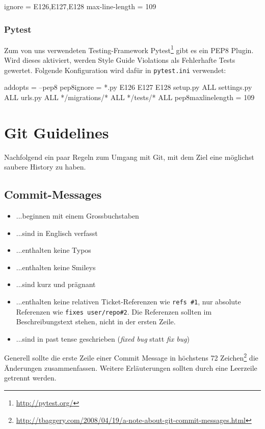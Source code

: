 \begin{inicode}
[flake8]
ignore = E126,E127,E128
max-line-length = 109
\end{inicode}

\subsubsection{Pytest}

Zum von uns verwendeten Testing-Framework
Pytest\footnote{\url{http://pytest.org/}} gibt es ein PEP8 Plugin. Wird dieses
aktiviert, werden Style Guide Violations als Fehlerhafte Tests gewertet.
Folgende Konfiguration wird dafür in \texttt{pytest.ini} verwendet:

\begin{inicode}
[pytest]
addopts = --pep8
pep8ignore =
    *.py E126 E127 E128
    setup.py ALL
    settings.py ALL
    urls.py ALL
    */migrations/* ALL
    */tests/* ALL
pep8maxlinelength = 109
\end{inicode}


\section{Git Guidelines}

Nachfolgend ein paar Regeln zum Umgang mit Git, mit dem Ziel eine möglichst
saubere History zu haben.

\subsection{Commit-Messages}

\begin{itemize}
	\item ...beginnen mit einem Grossbuchstaben
	\item ...sind in Englisch verfasst
	\item ...enthalten keine Typos
	\item ...enthalten keine Smileys
	\item ...sind kurz und prägnant
	\item ...enthalten keine relativen Ticket-Referenzen wie \texttt{refs \#1},
		nur absolute Referenzen wie \texttt{fixes user/repo\#2}. Die
		Referenzen sollten im Beschreibungstext stehen, nicht in der ersten Zeile.
	\item ...sind in past tense geschrieben (\textit{fixed bug} statt \textit{fix
		bug})
\end{itemize}

\noindent Generell sollte die erste Zeile einer Commit Message in höchstens 72
Zeichen\footnote{\url{http://tbaggery.com/2008/04/19/a-note-about-git-commit-messages.html}}
die Änderungen zusammenfassen. Weitere Erläuterungen sollten durch eine
Leerzeile getrennt werden.

